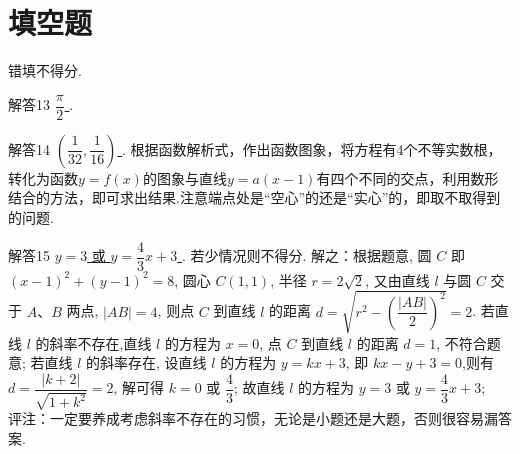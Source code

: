 \documentclass[11pt]{article}
\begin{document}
\section{\heiti 填空题}
错填不得分. 
\begin{compactdesc}
	\item[解答13] \underline{ $\dfrac{\pi}{2}$ }. 
	\item[解答14] \underline{ $ \left ( \dfrac{1}{32},\dfrac{1}{16}   \right )  $ }. 根据函数解析式，作出函数图象，将方程有4个不等实数根，转化为函数$y=f(x)$的图象与直线$ y=a(x-1) $有四个不同的交点，利用数形结合的方法，即可求出结果.注意端点处是“空心”的还是“实心”的，即取不取得到的问题.
	\item[解答15]  \underline{ $y=3$ 或 $y=\dfrac{4}{3}x+3$ }. 若少情况则不得分. 解之：根据题意, 圆 $C$ 即 $(x-1)^{2}+(y-1)^{2}=8$, 圆心 $C(1,1)$, 半径 $r=2 \sqrt{2}$,
	又由直线 $l$ 与圆 $C$ 交于 $A 、 B$ 两点, $|A B|=4$, 则点 $C$ 到直线 $l$ 的距离
	$d=\sqrt{r^{2}-\left(\dfrac{|A B|}{2}\right)^{2}}=2	$. 
	\heiti 若直线 $l$ 的斜率不存在,\songti 直线 $l$ 的方程为 $x=0$, 点 $C$ 到直线 $l$ 的距离 $d=1$, 不符合题意; 若直线 $l$ 的斜率存在, 设直线 $l$ 的方程为 $y=k x+3$, 即 $k x-y+3=0$,则有 $d=\dfrac{|k+2|}{\sqrt{1+k^{2}}}=2$, 解可得 $k=0$ 或 $\dfrac{4}{3}$; 故直线 $l$ 的方程为 $y=3$ 或 $y=\dfrac{4}{3} x+3$;
	\\ \heiti 评注：\songti 一定要养成考虑斜率不存在的习惯，无论是小题还是大题，否则很容易漏答案.
	

\end{compactdesc}
\end{document}
